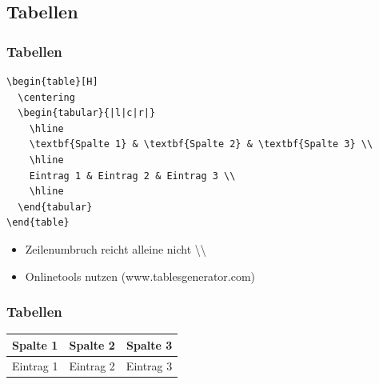 \documentclass[aspectratio=169]{beamer}
\begin{document}

\subsection{Tabellen}

\begin{frame}[fragile]
\frametitle{Tabellen}

\begin{lstlisting}[language={[latex]TeX}]
\begin{table}[H] 
  \centering
  \begin{tabular}{|l|c|r|} 
    \hline
    \textbf{Spalte 1} & \textbf{Spalte 2} & \textbf{Spalte 3} \\ 
    \hline
    Eintrag 1 & Eintrag 2 & Eintrag 3 \\ 
    \hline
  \end{tabular}
\end{table}
\end{lstlisting}

\vspace{1em}

\begin{itemize}
  \item Zeilenumbruch reicht alleine nicht \textbackslash\textbackslash 
  \item Onlinetools nutzen (www.tablesgenerator.com)
\end{itemize}

\end{frame}

\begin{frame}[fragile]
  \frametitle{Tabellen}
  \begin{table}[H] 
    \centering
    \begin{tabular}{|l|c|r|} 
      \hline
      \textbf{Spalte 1} & \textbf{Spalte 2} & \textbf{Spalte 3} \\ 
      \hline
      Eintrag 1 & Eintrag 2 & Eintrag 3 \\ 
      \hline
    \end{tabular}
  \end{table}
\end{frame}

\end{document}
